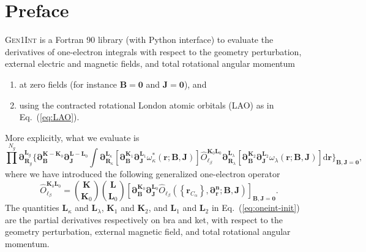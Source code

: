 \documentclass[a4paper,11pt,twoside,openright]{book}
\begin{document}
\chapter*{Preface}
\label{chap:preface}


\textsc{Gen1Int} is a Fortran 90 library (with Python interface) to evaluate the derivatives of one-electron
integrals with respect to the geometry perturbation, external electric and magnetic fields, and total rotational
angular momentum
\begin{enumerate}
  \item at zero fields (for instance $\boldsymbol{B}=\boldsymbol{0}$ and $\boldsymbol{J}=\boldsymbol{0}$), and
  \item using the contracted rotational London atomic orbitals (LAO) as in Eq.~(\ref{eq:LAO}).
\end{enumerate}

More explicitly, what we evaluate is
\begin{equation}
  \label{eq:oneint-init}
  \prod^{N_{g}}\boldsymbol{\partial}_{\boldsymbol{R}_{g}}^{\boldsymbol{L}_{g}}%
    \biggl\{\boldsymbol{\partial}_{\boldsymbol{B}}^{\boldsymbol{K}-\boldsymbol{K}_{0}}%
    \boldsymbol{\partial}_{\boldsymbol{J}}^{\boldsymbol{L}-\boldsymbol{L}_{0}}%
    \int\boldsymbol{\partial}_{\boldsymbol{R}_{\kappa}}^{\boldsymbol{L}_{\kappa}}%
      \left[\boldsymbol{\partial}_{\boldsymbol{B}}^{\boldsymbol{K}_{1}}%
        \boldsymbol{\partial}_{\boldsymbol{J}}^{\boldsymbol{L}_{1}}%
        \omega_{\kappa}^\ast(\boldsymbol{r};\boldsymbol{B},\boldsymbol{J})\right]%
    \hat{O}_{\ell_{\beta}}^{\boldsymbol{K}_{0}\boldsymbol{L}_{0}}%
    \boldsymbol{\partial}_{\boldsymbol{R}_{\lambda}}^{\boldsymbol{L}_{\lambda}}%
      \left[\boldsymbol{\partial}_{\boldsymbol{B}}^{\boldsymbol{K}_{2}}%
        \boldsymbol{\partial}_{\boldsymbol{J}}^{\boldsymbol{L}_{2}}%
        \omega_{\lambda}(\boldsymbol{r};\boldsymbol{B},\boldsymbol{J})\right]%
      \mathrm{d}\boldsymbol{r}\biggr\}_{\boldsymbol{B},\boldsymbol{J}=\boldsymbol{0}},
\end{equation}
where we have introduced the following generalized one-electron operator~\cite{bgkrth-a,bgkr}
\begin{equation}
  \label{eq:genint-operator}
  \hat{O}_{\ell_{\beta}}^{\boldsymbol{K}_{0}\boldsymbol{L}_{0}}%
  =\binom{\boldsymbol{K}}{\boldsymbol{K}_{0}}\binom{\boldsymbol{L}}{\boldsymbol{L}_{0}}%
    \left[\boldsymbol{\partial}_{\boldsymbol{B}}^{\boldsymbol{K}_{0}}%
      \boldsymbol{\partial}_{\boldsymbol{J}}^{\boldsymbol{L}_{0}}%
        \hat{O}_{\ell_{\beta}}\left(\left\{\boldsymbol{r}_{C_{\alpha}}\right\},\boldsymbol{\partial_{r}^{n}};%
          \boldsymbol{B},\boldsymbol{J}\right)\right]_{\boldsymbol{B},\boldsymbol{J}=\boldsymbol{0}}.
\end{equation}
The quantities $\boldsymbol{L}_{\kappa}$ and $\boldsymbol{L}_{\lambda}$, $\boldsymbol{K}_{1}$ and $\boldsymbol{K}_{2}$,
and $\boldsymbol{L}_{1}$ and $\boldsymbol{L}_{2}$ in Eq.~(\ref{eq:oneint-init}) are the partial derivatives respectively on bra
and ket, with respect to the geometry perturbation, external magnetic field, and total rotational angular momentum.
\end{document}
